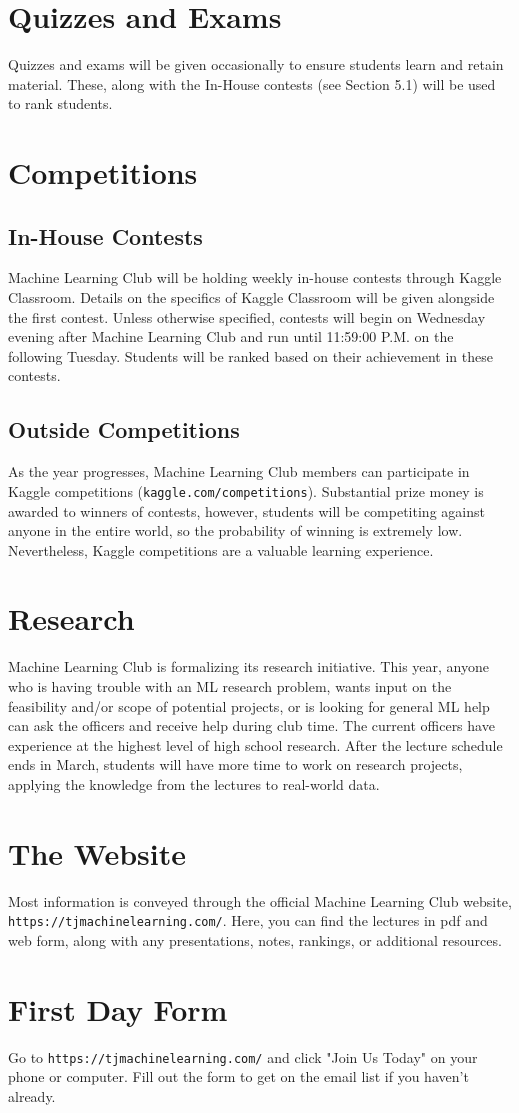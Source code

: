 \documentclass{article}
\begin{document}
\section{Quizzes and Exams}
Quizzes and exams will be given occasionally to ensure students learn and retain material. These, along with the In-House contests (see Section 5.1) will be used to rank students.

\section{Competitions}
\subsection{In-House Contests}
Machine Learning Club will be holding weekly in-house contests through Kaggle Classroom. Details on the specifics of Kaggle Classroom will be given alongside the first contest. Unless otherwise specified, contests will begin on Wednesday evening after Machine Learning Club and run until 11:59:00 P.M. on the following Tuesday. Students will be ranked based on their achievement in these contests.

\subsection{Outside Competitions}
As the year progresses, Machine Learning Club members can participate in Kaggle competitions (\texttt{kaggle.com/competitions}). Substantial prize money is awarded to winners of contests, however, students will be competiting against anyone in the entire world, so the probability of winning is extremely low. Nevertheless, Kaggle competitions are a valuable learning experience.

\section{Research}
Machine Learning Club is formalizing its research initiative. This year, anyone who is having trouble with an ML research problem, wants input on the feasibility and/or scope of potential projects, or is looking for general ML help can ask the officers and receive help during club time. The current officers have experience at the highest level of high school research. After the lecture schedule ends in March, students will have more time to work on research projects, applying the knowledge from the lectures to real-world data.

\section{The Website}
Most information is conveyed through the official Machine Learning Club website, \texttt{https://tjmachinelearning.com/}. Here, you can find the lectures in pdf and web form, along with any presentations, notes, rankings, or additional resources.

\section{First Day Form}
Go to \texttt{https://tjmachinelearning.com/} and click "Join Us Today" on your phone or computer. Fill out the form to get on the email list if you haven't already.
\end{document}
